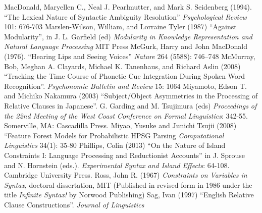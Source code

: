 \documentclass[a4paper]{article}
\begin{document}
\newline
MacDonald, Maryellen C., 
Neal J. Pearlmutter,
and Mark S. Seidenberg  (1994).  ``The Lexical Nature of Syntactic 
Ambiguity Resolution'' 
{\it Psychological Review} 101: 676-703
\newline
\newline
Marslen-Wilson, William, and Lorraine Tyler (1987) ``Against Modularity'', in J. L.
Garfield (ed) {\it Modularity in Knowledge Representation and Natural Language Processing}
MIT Press
\newline
\newline
McGurk, Harry and John MacDonald (1976). ``Hearing Lips and Seeing Voices'' {\it Nature} 264 (5588): 746–748
\newline
\newline
McMurray, Bob, Meghan A. Clayards, Michael K. Tanenhaus, and Richard Aslin  (2008) ``Tracking the Time Course of Phonetic Cue Integration During Spoken Word Recognition''. {\it Psychonomic Bulletin and Review} 15: 1064
\newline
\newline
Miyamoto, Edson T. and
Michiko Nakamura (2003) ``Subject/Object
Asymmetries
in the Processing
of Relative Clauses
in Japanese''.  G. Garding and M. Tsujimura (eds) {\it Proceedings of the 22nd Meeting of the West Coast Conference on Formal Linguistics}:  342-55. Somerville, MA: 
Cascadilla Press. 
\newline
\newline
Miyao, Yusuke  and Junichi Tsujii (2008) ``Feature Forest Models for
Probabilistic HPSG Parsing  {\it Computational Linguistics} 34(1): 35-80
\newline
\newline
Phillips, Colin (2013) ``On the Nature of Island Constraints I: Language Processing and Reductionist Accounts'' in
J. Sprouse and N. Hornstein (eds.).
{\it Experimental Syntax
and Island Effects}: 64-108.
Cambridge University
Press.
\newline
\newline
Ross, John R. (1967) {\it Constraints on Variables in Syntax}, doctoral dissertation, MIT  (Published in revised form in 1986 under the title {\it Infinite Syntax!} by Norwood Publishing)
\newline
\newline
Sag, Ivan (1997) ``English Relative Clause Constructions''.  {\it Journal of
Linguistics}
\end{document}

